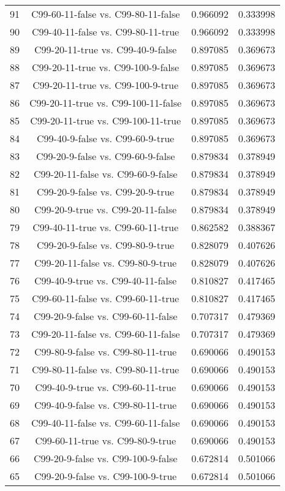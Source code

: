 \documentclass[a4paper,10pt]{article}
\begin{document}
\begin{landscape}
\begin{table}[!htp]
\begin{tabular}{cccc}
91&C99-60-11-false vs. C99-80-11-false&0.966092&0.333998\\
90&C99-40-11-false vs. C99-80-11-true&0.966092&0.333998\\
89&C99-20-11-true vs. C99-40-9-false&0.897085&0.369673\\
88&C99-20-11-true vs. C99-100-9-false&0.897085&0.369673\\
87&C99-20-11-true vs. C99-100-9-true&0.897085&0.369673\\
86&C99-20-11-true vs. C99-100-11-false&0.897085&0.369673\\
85&C99-20-11-true vs. C99-100-11-true&0.897085&0.369673\\
84&C99-40-9-false vs. C99-60-9-true&0.897085&0.369673\\
83&C99-20-9-false vs. C99-60-9-false&0.879834&0.378949\\
82&C99-20-11-false vs. C99-60-9-false&0.879834&0.378949\\
81&C99-20-9-false vs. C99-20-9-true&0.879834&0.378949\\
80&C99-20-9-true vs. C99-20-11-false&0.879834&0.378949\\
79&C99-40-11-true vs. C99-60-11-true&0.862582&0.388367\\
78&C99-20-9-false vs. C99-80-9-true&0.828079&0.407626\\
77&C99-20-11-false vs. C99-80-9-true&0.828079&0.407626\\
76&C99-40-9-true vs. C99-40-11-false&0.810827&0.417465\\
75&C99-60-11-false vs. C99-60-11-true&0.810827&0.417465\\
74&C99-20-9-false vs. C99-60-11-false&0.707317&0.479369\\
73&C99-20-11-false vs. C99-60-11-false&0.707317&0.479369\\
72&C99-80-9-false vs. C99-80-11-true&0.690066&0.490153\\
71&C99-80-11-false vs. C99-80-11-true&0.690066&0.490153\\
70&C99-40-9-true vs. C99-60-11-true&0.690066&0.490153\\
69&C99-40-9-false vs. C99-80-11-true&0.690066&0.490153\\
68&C99-40-11-false vs. C99-60-11-false&0.690066&0.490153\\
67&C99-60-11-true vs. C99-80-9-true&0.690066&0.490153\\
66&C99-20-9-false vs. C99-100-9-false&0.672814&0.501066\\
65&C99-20-9-false vs. C99-100-9-true&0.672814&0.501066\\

\end{tabular}
\end{table}
\end{landscape}
\end{document}
